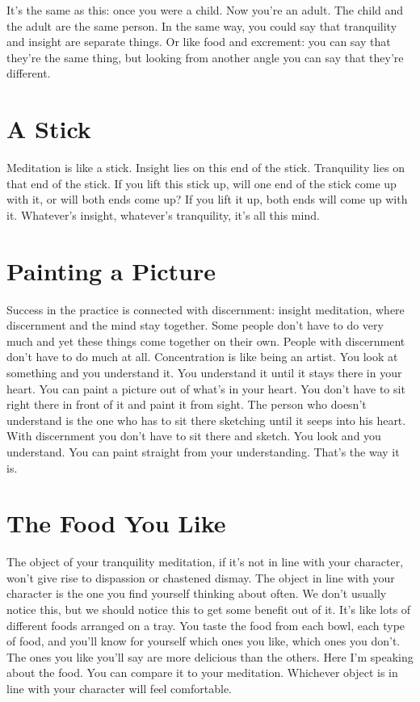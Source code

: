It's the same as this: once you were a child. Now you're an adult. The child and the adult are the same person. In the same way, you could say that tranquility and insight are separate things. Or like food and excrement: you can say that they're the same thing, but looking from another angle you can say that they're different.

\clearpage

\section{A Stick}

Meditation is like a stick. Insight lies on this end of the stick. Tranquility lies on that end of the stick. If you lift this stick up, will one end of the stick come up with it, or will both ends come up? If you lift it up, both ends will come up with it. Whatever's insight, whatever's tranquility, it's all this mind. 

\section{Painting a Picture}

Success in the practice is connected with discernment: insight meditation, where discernment and the mind stay together. Some people don't have to do very much and yet these things come together on their own. People with discernment don't have to do much at all. Concentration is like being an artist. You look at something and you understand it. You understand it until it stays there in your heart. You can paint a picture out of what's in your heart. You don't have to sit right there in front of it and paint it from sight. The person who doesn't understand is the one who has to sit there sketching until it seeps into his heart. With discernment you don't have to sit there and sketch. You look and you understand. You can paint straight from your understanding. That's the way it is.

\clearpage

\section{The Food You Like}

The object of your tranquility meditation, if it's not in line with your character, won't give rise to dispassion or chastened dismay. The object in line with your character is the one you find yourself thinking about often. We don't usually notice this, but we should notice this to get some benefit out of it. It's like lots of different foods arranged on a tray. You taste the food from each bowl, each type of food, and you'll know for yourself which ones you like, which ones you don't. The ones you like you'll say are more delicious than the others. Here I'm speaking about the food. You can compare it to your meditation. Whichever object is in line with your character will feel comfortable.

